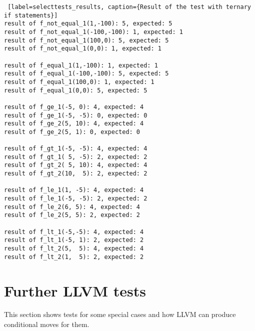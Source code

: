 \documentclass[12pt,twoside,notitlepage]{report}
\begin{document}
%

%


\begin{lstlisting} [label=selecttests_results, caption={Result of the test with ternary if statements}]
result of f_not_equal_1(1,-100): 5, expected: 5
result of f_not_equal_1(-100,-100): 1, expected: 1
result of f_not_equal_1(100,0): 5, expected: 5
result of f_not_equal_1(0,0): 1, expected: 1

result of f_equal_1(1,-100): 1, expected: 1
result of f_equal_1(-100,-100): 5, expected: 5
result of f_equal_1(100,0): 1, expected: 1
result of f_equal_1(0,0): 5, expected: 5

result of f_ge_1(-5, 0): 4, expected: 4
result of f_ge_1(-5, -5): 0, expected: 0
result of f_ge_2(5, 10): 4, expected: 4
result of f_ge_2(5, 1): 0, expected: 0

result of f_gt_1(-5, -5): 4, expected: 4
result of f_gt_1( 5, -5): 2, expected: 2
result of f_gt_2( 5, 10): 4, expected: 4
result of f_gt_2(10,  5): 2, expected: 2

result of f_le_1(1, -5): 4, expected: 4
result of f_le_1(-5, -5): 2, expected: 2
result of f_le_2(6, 5): 4, expected: 4
result of f_le_2(5, 5): 2, expected: 2

result of f_lt_1(-5,-5): 4, expected: 4
result of f_lt_1(-5, 1): 2, expected: 2
result of f_lt_2(5,  5): 4, expected: 4
result of f_lt_2(1,  5): 2, expected: 2

\end{lstlisting}

\section{Further LLVM tests}

This section shows tests for some special cases and how LLVM can produce conditional moves for them.

%
\end{document}
